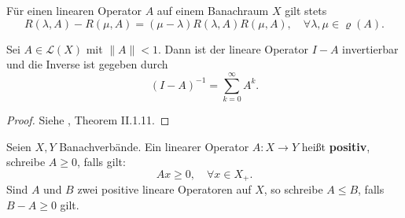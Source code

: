 \begin{bem}[Resolventengleichung]\label{Resolventengleichung}
Für einen linearen Operator $A$ auf einem Banachraum $X$ gilt stets
\begin{equation*}
R(\lambda, A)-R(\mu, A)=(\mu-\lambda)R(\lambda, A) R(\mu, A),\quad\forall \lambda,\mu\in \varrho(A).
\end{equation*}
\end{bem}



\begin{satz}\label{Satz von der Neumann'schen Reihe}
Sei $A\in \mathcal L(X)$ mit $\|A\| < 1$. Dann ist der lineare Operator $I-A$ invertierbar und die Inverse ist gegeben durch
\begin{equation*}
    (I-A)^{-1}=\sum_{k=0}^\infty A^k.
\end{equation*}
\end{satz}

\begin{proof}
Siehe  \cite{werner_2007}, Theorem II.1.11. 
\end{proof}


 

\begin{defi}
Seien $X, Y$ Banachverbände. Ein linearer Operator $A\colon X\to Y$ heißt \textbf{positiv}, schreibe $A\geq0$, falls gilt:
\begin{equation*}
    Ax\geq0,\quad\forall x\in X_+. 
\end{equation*}
Sind $A$ und $B$ zwei positive lineare Operatoren auf $X$, so schreibe \newline$A\leq B$, falls $B-A\geq0$ gilt.
\end{defi}



